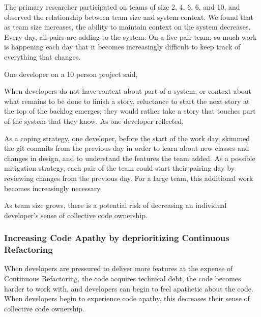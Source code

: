 The primary researcher participated on teams of size 2, 4, 6, 6, and 10, and observed the relationship between team size and system context. We found that as team size increases, the ability to maintain context on the system decreases. Every day, all pairs are adding to the system. On a five pair team, so much work is happening each day that it becomes increasingly difficult to keep track of everything that changes.

One developer on a 10 person project said, 

When developers do not have context about part of a system, or context about what remains to be done to finish a story, reluctance to start the next story  at the top of the backlog emerges; they would rather take a story that touches part of the system that they know. As one developer reflected, 

As a coping strategy, one developer, before the start of the work day, skimmed the git commits from the previous day in order to learn about new classes and changes in design, and to understand the features the team added. As a possible mitigation strategy, each pair of the team could start their pairing day by reviewing changes from the previous day. For a large team, this additional work becomes increasingly necessary. 

As team size grows, there is a potential risk of decreasing an individual developer's sense of collective code ownership. 

\subsubsection{ Increasing Code Apathy by deprioritizing Continuous Refactoring }

When developers are pressured to deliver more features at the expense of Continuous Refactoring, the code acquires technical debt, the code becomes harder to work with, and developers can begin to feel apathetic about the code. When developers begin to experience code apathy, this decreases their sense of collective code ownership. 


